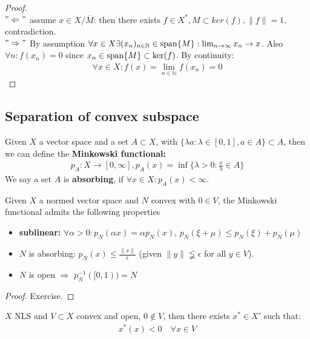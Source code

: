 \begin{proof} \quad\\
$"\Leftarrow"$ assume $x \in X \slash \overline{M}$: then there exists $f \in X^*, M\subset ker(f), \|f\| = 1$, contradiction.\\
$"\Rightarrow"$ By assumption $\forall x \in X \exists (x_n)_{n \in \mathbb{N}} \in \operatorname*{span}\{M\}: \lim_{n \rightarrow \infty} x_n \rightarrow x$. Also $\forall n: f(x_n) = 0$ since $x_n \in \operatorname*{span}\{ M \}\subset \ker(f)$. By continuity:
\begin{align*}
	\forall x \in X: f(x) = \lim_{n \in \mathbb{N}}f(x_n) = 0
\end{align*}
\end{proof}



\subsection{Separation of convex subspace}
\begin{definition}
	Given $X$ a vector space and a set $A \subset X$, with $\{\lambda a: \lambda \in [0, 1], a \in A\} \subset A$, then we can define the \textbf{Minkowski functional:}
	\begin{align*}
		p_A: X \rightarrow [0, \infty], p_A(x) = \inf\{\lambda >0 : \frac{x}{\lambda} \in A\} 
	\end{align*}
	We say a set $A$ is \textbf{absorbing}, if $\forall x \in X: p_A(x) < \infty$.
\end{definition}

\begin{lemma}
	Given $X$ a normed vector space and $N$ convex with $0 \in V$, the Minkowski functional admits the following properties
	\begin{itemize}
		\item \textbf{sublinear:} $\forall \alpha > 0: p_N(\alpha x ) = \alpha p_N(x)$, $p_N(\xi + \mu) \leq p_N(\xi) + p_N(\mu)$
		\item $N$ is absorbing: $p_N(x) \le \frac{\|x\|}{\epsilon}$ (given $\|y\| \lneqq \epsilon$ for all $y \in V$). 
		\item $N$ is open $\Rightarrow$ $p_N^{-1}([0, 1)) = N$
	\end{itemize}
\end{lemma}
\begin{proof}
	Exercise.
\end{proof}

\begin{lemma}
	$X$ NLS and $V \subset X$ convex and open, $0 \notin V$, then there exists $x^* \in X'$ such that:
	\begin{align*}
		x^*(x) < 0 \quad \forall x \in V
	\end{align*}
\end{lemma}

